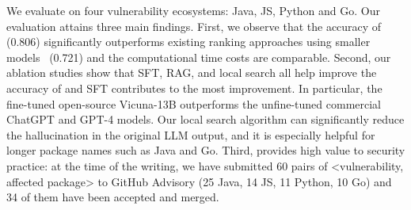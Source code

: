 

We evaluate \detector{} on four vulnerability ecosystems: Java, JS, Python and Go. Our evaluation attains three main findings. First, we observe that the accuracy of \detector{} (0.806) significantly outperforms existing ranking approaches using smaller models~\cite{fastxml,lightxml,chronos,vullibminer} (0.721) and the computational time costs are comparable. 
Second, our ablation studies show that SFT, RAG, and local search all help improve the accuracy of \detector{} and SFT contributes to the most improvement. In particular, the fine-tuned open-source Vicuna-13B outperforms the unfine-tuned commercial ChatGPT and GPT-4 models. Our local search algorithm can significantly reduce the hallucination in the original LLM output, and it is especially helpful for longer package names such as Java and Go. Third, \detector{} provides high value to security practice: at the time of the writing, we have submitted 60 pairs of <vulnerability, affected package> to GitHub Advisory (25 Java, 14 JS, 11 Python, 10 Go) and 34 of them have been accepted and merged.

